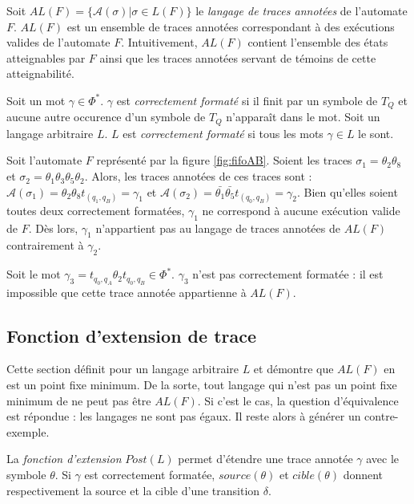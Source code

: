 Soit $AL(F)=\{\mathcal{A}(\sigma)|\sigma \in L(F)\}$ le \emph{langage de traces annotées} de l'automate $F$. $AL(F)$ est un ensemble de traces annotées correspondant à des exécutions valides de l'automate $F$. Intuitivement, $AL(F)$ contient l'ensemble des états atteignables par $F$ ainsi que les traces annotées servant de témoins de cette atteignabilité.

Soit un mot $\gamma \in \Phi^*$. $\gamma$ est \emph{correctement formaté} si il finit par un symbole de $T_Q$ et aucune autre occurence d'un symbole de $T_Q$ n'apparaît dans le mot. Soit un langage arbitraire $L$. $L$ est \emph{correctement formaté} si tous les mots $\gamma\in L$ le sont.


\begin{example}
Soit l'automate $F$ représenté par la figure \ref{fig:fifoAB}. Soient les traces $\sigma_1=\theta_2\theta_8$ et $\sigma_2=\theta_1\theta_3\theta_5\theta_2$. Alors, les traces annotées de ces traces sont : $\mathcal{A}(\sigma_1)=\theta_2\theta_8t_{(q_1,q_B)}=\gamma_1$ et $\mathcal{A}(\sigma_2)=\bar{\theta_1}\bar{\theta_5}t_{(q_0,q_B)}=\gamma_2$.
Bien qu'elles soient toutes deux correctement formatées, $\gamma_1$ ne correspond à aucune exécution valide de $F$. Dès lors, $\gamma_1$ n'appartient pas au langage de traces annotées de $AL(F)$ contrairement à $\gamma_2$.

Soit le mot $\gamma_3=t_{q_0,q_A}\theta_2 t_{q_0,q_B} \in \Phi^*$. $\gamma_3$ n'est pas correctement formatée : il est impossible que cette trace annotée appartienne à $AL(F)$.
\end{example}



\subsection{Fonction d'extension de trace}\label{trace:extension}

Cette section définit \fl pour un langage arbitraire $L$ et démontre que $AL(F)$ en est un point fixe minimum. De la sorte, tout langage qui n'est pas un point fixe minimum de \fl ne peut pas être $AL(F)$. Si c'est le cas, la question d'équivalence est répondue : les langages ne sont pas égaux. Il reste alors à générer un contre-exemple.

La \emph{fonction d'extension} $Post(L)$ permet d'étendre une trace annotée $\gamma$ avec le symbole $\theta$. Si $\gamma$ est correctement formatée, $source(\theta)$ et $cible(\theta)$ donnent respectivement la source et la cible d'une transition $\delta$.

